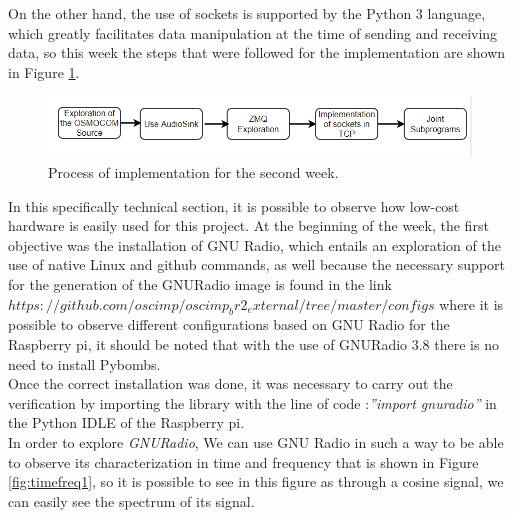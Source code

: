 \documentclass[12pt, twoside]{report}
\begin{document}
On the other hand, the use of sockets is supported by the Python 3 language, which greatly facilitates data manipulation at the time of sending and receiving data, so this week the steps that were followed for the implementation are shown in Figure \ref{fig:scheme2a}.
\begin{figure}[!h]
\centering
  \includegraphics[width=\linewidth]{images/process2.png}
  \caption{Process of implementation for the second week.}
  \label{fig:scheme2a}
\end{figure}
In this specifically technical section, it is possible to observe how low-cost hardware is easily used for this project. At the beginning of the week, the first objective was the installation of GNU Radio, which entails an exploration of the use of native Linux and github commands, as well because the necessary support for the generation of the GNURadio image is found in the link $https://github.com/oscimp/oscimp_br2_external/tree/master/configs$ where it is possible to observe different configurations based on GNU Radio for the Raspberry pi, it should be noted that with the use of GNURadio 3.8 there is no need to install Pybombs.\\
Once the correct installation was done, it was necessary to carry out the verification by importing the library with the line of code :\textit{”import gnuradio”} in the Python IDLE of the Raspberry pi.\\ 
In order to explore \textit{GNURadio}, We can use GNU Radio in such a way to be able to observe its characterization in time and frequency that is shown in Figure \ref{fig:timefreq1}, so it is possible to see in this figure as through a cosine signal, we can easily see the spectrum of its signal.
\end{document}
